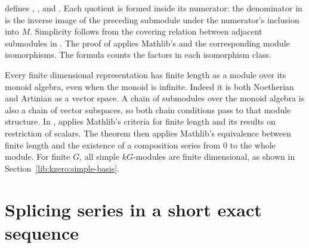 \begin{implementation}
 defines
, , and
. Each quotient is formed inside its
numerator: the denominator in
 is the inverse image of the preceding submodule
under the numerator's inclusion into $M$. Simplicity follows from the
covering relation between adjacent submodules in
.
The proof of  applies Mathlib's
 and the corresponding module
isomorphisms. The formula
 counts the factors in each
isomorphism class.
\end{implementation}

Every finite dimensional representation has finite length as a module over
its monoid algebra, even when the monoid is infinite. Indeed it is both
Noetherian and Artinian as a vector space. A chain of submodules over the
monoid algebra is also a chain of vector subspaces, so both chain conditions
pass to that module structure. In
,
 applies Mathlib's criteria for finite length
and its results on restriction of scalars. The theorem
 then applies Mathlib's equivalence between
finite length and the existence of a composition series from $0$ to the whole module.
For finite $G$, all simple $kG$-modules are finite dimensional, as shown
in Section~\ref{lib:kzero:simple-basis}.

\section{Splicing series in a short exact sequence}
\label{lib:kzero:splicing}

